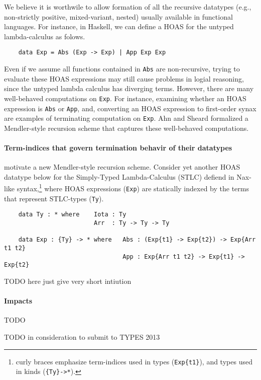 \documentclass[a4paper]{easychair} %
\newcommand{\eg}[0]{{e.g.}}
\begin{document}
We believe it is worthwile to allow formation of all the recursive datatypes
(\eg, non-strictly positive, mixed-variant, nested)
usually available in functional languages. For instance,
in Haskell, we can define a HOAS for the untyped lambda-calculus
as folows.
\begin{verbatim}
    data Exp = Abs (Exp -> Exp) | App Exp Exp
\end{verbatim}
Even if we assume all functions contained in \texttt{Abs} are non-recursive,
trying to evaluate these HOAS expressions may still cause problems in logial reasoning,
since the untyped lambda calculus has diverging terms. However, there are
many well-behaved computations on \texttt{Exp}. For instance, examining whether
an HOAS expression is \texttt{Abs} or \texttt{App}, and, converting an HOAS expression
to first-order synax are examples of terminating computation on \texttt{Exp}.
Ahn and Sheard \cite{AhnShe11} formalized a Mendler-style recursion scheme
that captures these well-behaved computations.

\paragraph{Term-indices that govern termination behavir of their datatypes\!\!}
motivate a new Mendler-style recursion scheme.
Consider yet another HOAS datatype below for the Simply-Typed Lambda-Calculus (STLC)
defiend in Nax-like syntax,\footnote{curly braces emphasize
  term-indices used in types (\texttt{Exp\{t1\}}),
  and types used in kinds (\texttt{\{Ty\}\;->\;*}).}
where HOAS expressions (\texttt{Exp}) are
statically indexed by the terms that represent STLC-types (\texttt{Ty}).
\begin{verbatim}
    data Ty : * where    Iota : Ty
                         Arr  : Ty -> Ty -> Ty

    data Exp : {Ty} -> * where   Abs : (Exp{t1} -> Exp{t2}) -> Exp{Arr t1 t2}
                                 App : Exp{Arr t1 t2} -> Exp{t1} -> Exp{t2}
\end{verbatim}
TODO here just give very short intiution

\paragraph{Impacts} TODO

TODO in consideration to submit to TYPES 2013

\end{document}

